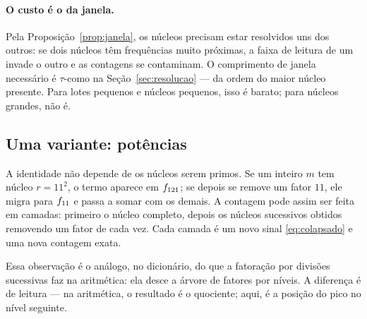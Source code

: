 \paragraph{O custo é o da janela.} Pela Proposição~\ref{prop:janela}, os núcleos
precisam estar resolvidos uns dos outros: se dois núcleos têm frequências muito
próximas, a faixa de leitura de um invade o outro e as contagens se contaminam. O
comprimento de janela necessário é $\tau$-como na Seção~\ref{sec:resolucao} — da
ordem do maior núcleo presente. Para lotes pequenos e núcleos pequenos, isso é
barato; para núcleos grandes, não é.

\subsection{Uma variante: potências}

A identidade não depende de os núcleos serem primos. Se um inteiro $m$ tem núcleo
$r=11^2$, o termo aparece em $f_{121}$; se depois se remove um fator $11$, ele
migra para $f_{11}$ e passa a somar com os demais. A contagem pode assim ser
feita em camadas: primeiro o núcleo completo, depois os núcleos sucessivos obtidos
removendo um fator de cada vez. Cada camada é um novo sinal
\eqref{eq:colapsado} e uma nova contagem exata.

Essa observação é o análogo, no dicionário, do que a fatoração por divisões
sucessivas faz na aritmética: ela desce a árvore de fatores por níveis. A
diferença é de leitura — na aritmética, o resultado é o quociente; aqui, é a
posição do pico no nível seguinte.
